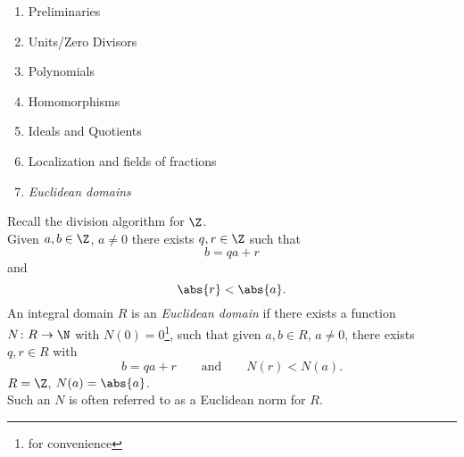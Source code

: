 \begin{enumerate}
\item Preliminaries
\item Units/Zero Divisors
\item Polynomials
\item Homomorphisms
\item Ideals and Quotients
\item Localization and fields of fractions
\item \emph{Euclidean domains}
\end{enumerate}

Recall the division algorithm for $\Z$. \\
Given $a,b\in\Z$, $a\neq0$ there exists $q,r\in\Z$ such that
\[ b = qa+r \]
and
\[ \abs{r} < \abs{a} . \]
 An integral domain $R$ is an \emph{Euclidean domain} if there exists a function $N\colon R\to\N$ with $N(0)=0$\footnote{for convenience}, such that given $a,b\in R$, $a\neq0$, there exists $q,r\in R$ with
\[ b = qa+r \qquad\text{and}\qquad N(r)<N(a) . \]
\ex $R=\Z$, $N(a)=\abs{a}$. \\
Such an $N$ is often referred to as a Euclidean norm for $R$.

